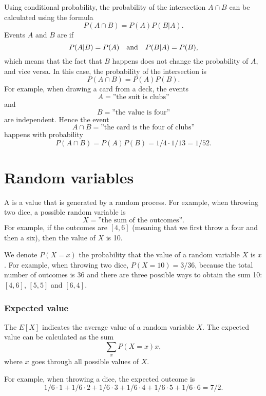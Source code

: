
Using conditional probability,
the probability of the intersection
$A \cap B$ can be calculated using the formula
\[P(A \cap B)=P(A)P(B|A).\]
Events $A$ and $B$ are  if
\[P(A|B)=P(A) \hspace{10px}\textrm{and}\hspace{10px} P(B|A)=P(B),\]
which means that the fact that $B$ happens does not
change the probability of $A$, and vice versa.
In this case, the probability of the intersection is
\[P(A \cap B)=P(A)P(B).\]
For example, when drawing a card from a deck, the events
\[A = \textrm{''the suit is clubs''}\]
and
\[B = \textrm{''the value is four''}\]
are independent. Hence the event
\[A \cap B = \textrm{''the card is the four of clubs''}\]
happens with probability
\[P(A \cap B)=P(A)P(B)=1/4 \cdot 1/13 = 1/52.\]

\section{Random variables}


A  is a value that is generated
by a random process.
For example, when throwing two dice,
a possible random variable is
\[X=\textrm{''the sum of the outcomes''}.\]
For example, if the outcomes are $[4,6]$
(meaning that we first throw a four and then a six),
then the value of $X$ is 10.

We denote $P(X=x)$ the probability that
the value of a random variable $X$ is $x$.
For example, when throwing two dice,
$P(X=10)=3/36$,
because the total number of outcomes is 36
and there are three possible ways to obtain
the sum 10: $[4,6]$, $[5,5]$ and $[6,4]$.

\subsubsection{Expected value}


The  $E[X]$ indicates the
average value of a random variable $X$.
The expected value can be calculated as the sum
\[\sum_x P(X=x)x,\]
where $x$ goes through all possible values of $X$.

For example, when throwing a dice,
the expected outcome is
\[1/6 \cdot 1 + 1/6 \cdot 2 + 1/6 \cdot 3 + 1/6 \cdot 4 + 1/6 \cdot 5 + 1/6 \cdot 6 = 7/2.\]

